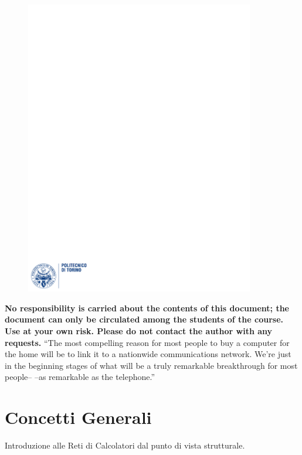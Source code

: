 \documentclass[12pt]{article}
\begin{document}
\begin{figure}
  \centering
  \includegraphics[width=10cm]{images/polito.pdf}
\end{figure}

\maketitle
\bigskip
\bigskip
\noindent \textbf{No responsibility is carried about the contents of this document; the document can only be circulated among the students of the course. Use at your own risk. Please do not contact the author with any requests.}
\newpage
\tableofcontents
\bigskip
\bigskip
``The most compelling reason for most people to buy a computer for the home will be to link it to a nationwide communications network. We’re just in the beginning stages of what will be a truly remarkable breakthrough for most people– –as remarkable as the telephone.''\\
\newpage

\section{Concetti Generali}\label{subsubsec}
Introduzione alle Reti di Calcolatori dal punto di vista strutturale.
\end{document}
